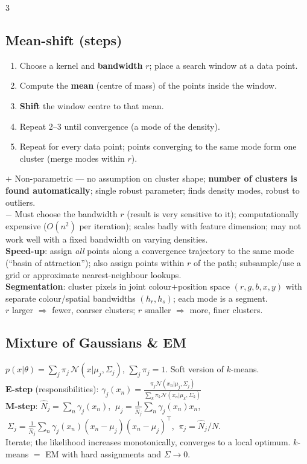 \documentclass[9pt,a4paper,landscape]{extarticle}
\newcommand{\key}[1]{\textbf{#1}}
\begin{document}
\begin{multicols}{3}
\subsection{Mean-shift (steps)}
\begin{enumerate}
\item Choose a kernel and \key{bandwidth} $r$; place a search window at a data point.
\item Compute the \key{mean} (centre of mass) of the points inside the window.
\item \key{Shift} the window centre to that mean.
\item Repeat 2--3 until convergence (a mode of the density).
\item Repeat for every data point; points converging to the same mode form one cluster (merge modes within $r$).
\end{enumerate}
$+$ Non-parametric --- no assumption on cluster shape; \key{number of clusters is found automatically}; single robust parameter; finds density modes, robust to outliers.\\
$-$ Must choose the bandwidth $r$ (result is very sensitive to it); computationally expensive ($O(n^2)$ per iteration); scales badly with feature dimension; may not work well with a fixed bandwidth on varying densities.\\
\key{Speed-up}: assign \emph{all} points along a convergence trajectory to the same mode (``basin of attraction''); also assign points within $r$ of the path; subsample/use a grid or approximate nearest-neighbour lookups.\\
\key{Segmentation}: cluster pixels in joint colour$+$position space $(r,g,b,x,y)$ with separate colour/spatial bandwidths $(h_r,h_s)$; each mode is a segment.\\
$r$ larger $\Rightarrow$ fewer, coarser clusters; $r$ smaller $\Rightarrow$ more, finer clusters.

\subsection{Mixture of Gaussians \& EM}
$p(x|\theta)=\sum_j\pi_j\,\mathcal N(x|\mu_j,\Sigma_j)$, $\sum_j\pi_j=1$. Soft version of $k$-means.\\
\key{E-step} (responsibilities): $\displaystyle\gamma_j(x_n)=\frac{\pi_j\mathcal N(x_n|\mu_j,\Sigma_j)}{\sum_k\pi_k\mathcal N(x_n|\mu_k,\Sigma_k)}$\\
\key{M-step}: $\hat N_j=\sum_n\gamma_j(x_n)$, $\ \mu_j=\frac1{\hat N_j}\sum_n\gamma_j(x_n)x_n$, $\ \Sigma_j=\frac1{\hat N_j}\sum_n\gamma_j(x_n)(x_n-\mu_j)(x_n-\mu_j)^\top$, $\ \pi_j=\hat N_j/N$.\\
Iterate; the likelihood increases monotonically, converges to a local optimum. $k$-means $=$ EM with hard assignments and $\Sigma\to0$.


\end{multicols}
\end{document}
